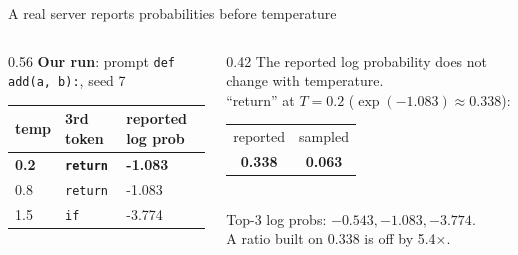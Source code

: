 \documentclass[aspectratio=169, 12pt]{beamer}
\begin{document}
\begin{frame}{A real server reports probabilities before temperature}
  \begin{columns}[T]
    \begin{column}{0.56\textwidth}
      {\footnotesize\textbf{Our run}: prompt \texttt{def add(a, b):}, seed 7}\\[0.05cm]
      \vspace{0.1cm}
      {\normalsize\renewcommand{\arraystretch}{1.35}%
      \begin{tabular}{@{}lll@{}}\toprule
        \textbf{temp} & \textbf{3rd token} & \textbf{reported log prob}\\\midrule
        \textbf{0.2} & \texttt{\textcolor{figblue}{\textbf{return}}} & \colorbox{figblue!12}{\textbf{-1.083}}\\
        0.8 & \texttt{\textcolor{figblue}{return}} & -1.083\\
        1.5 & \texttt{\textcolor{figred}{if}} & -3.774\\\bottomrule
      \end{tabular}}
    \end{column}
    \begin{column}{0.42\textwidth}
      \small The reported log probability does not change with temperature.\\[0.14cm]
      ``return'' at $T = 0.2$ ($\exp(-1.083) \approx 0.338$):\\[0.08cm]
      \begin{tabular}{@{}cc@{}}
        {\footnotesize reported} & {\footnotesize sampled}\\
        {\LARGE\textbf{0.338}} & {\LARGE\textbf{\textcolor{figred}{0.063}}}
      \end{tabular}\\[0.12cm]
      {\footnotesize Top-3 log probs: $-0.543, -1.083, -3.774$.\\A ratio built on 0.338 is off by 5.4$\times$.}
    \end{column}
  \end{columns}
\end{frame}
\end{document}
